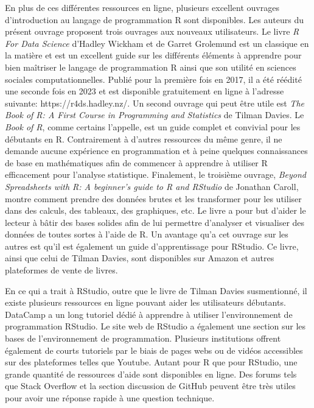 \documentclass[
  letterpaper,
  DIV=11,
  numbers=noendperiod]{scrreprt}
\begin{document}
En plus de ces différentes ressources en ligne, plusieurs excellent
ouvrages d'introduction au langage de programmation R sont disponibles.
Les auteurs du présent ouvrage proposent trois ouvrages aux nouveaux
utilisateurs. Le livre \emph{R For Data Science} d'Hadley Wickham et de
Garret Grolemund est un classique en la matière et est un excellent
guide sur les différents éléments à apprendre pour bien maîtriser le
langage de programmation R ainsi que son utilité en sciences sociales
computationnelles. Publié pour la première fois en 2017, il a été
réédité une seconde fois en 2023 et est disponible gratuitement en ligne
à l'adresse suivante: https://r4ds.hadley.nz/. Un second ouvrage qui
peut être utile est \emph{The Book of R: A First Course in Programming
and Statistics} de Tilman Davies. Le \emph{Book of R}, comme certains
l'appelle, est un guide complet et convivial pour les débutants en R.
Contrairement à d'autres ressources du même genre, il ne demande aucune
expérience en programmation et à peine quelques connaissances de base en
mathématiques afin de commencer à apprendre à utiliser R efficacement
pour l'analyse statistique. Finalement, le troisième ouvrage,
\emph{Beyond Spreadsheets with R: A beginner's guide to R and RStudio}
de Jonathan Caroll, montre comment prendre des données brutes et les
transformer pour les utiliser dans des calculs, des tableaux, des
graphiques, etc. Le livre a pour but d'aider le lecteur à bâtir des
bases solides afin de lui permettre d'analyser et visualiser des données
de toutes sortes à l'aide de R. Un avantage qu'a cet ouvrage sur les
autres est qu'il est également un guide d'apprentissage pour RStudio. Ce
livre, ainsi que celui de Tilman Davies, sont disponibles sur Amazon et
autres plateformes de vente de livres.

En ce qui a trait à RStudio, outre que le livre de Tilman Davies
susmentionné, il existe plusieurs ressources en ligne pouvant aider les
utilisateurs débutants. DataCamp a un long tutoriel dédié à apprendre à
utiliser l'environnement de programmation RStudio. Le site web de
RStudio a également une section sur les bases de l'environnement de
programmation. Plusieurs institutions offrent également de courts
tutoriels par le biais de pages webs ou de vidéos accessibles sur des
plateformes telles que Youtube. Autant pour R que pour RStudio, une
grande quantité de ressources d'aide sont disponibles en ligne. Des
forums tels que Stack Overflow et la section discussion de GitHub
peuvent être très utiles pour avoir une réponse rapide à une question
technique.
\end{document}
